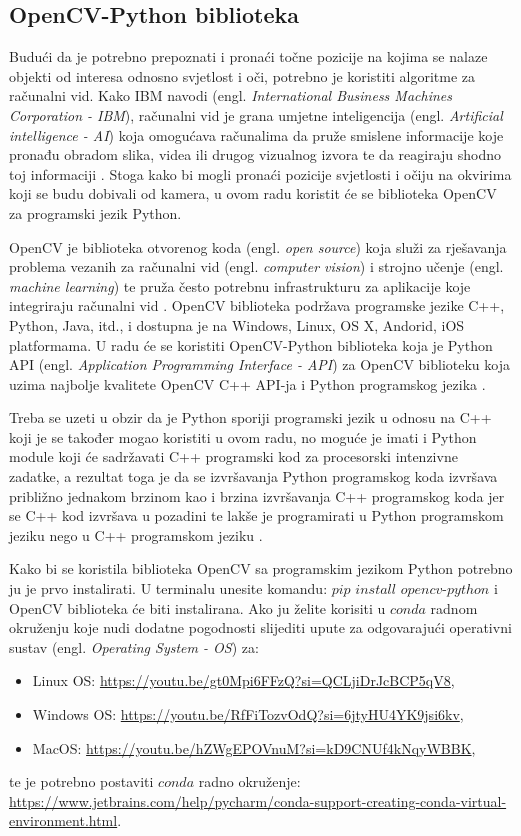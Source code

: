 \documentclass{foi}
\begin{document}
\subsection{OpenCV-Python biblioteka}

Budući da je potrebno prepoznati i pronaći točne pozicije na kojima se nalaze objekti od interesa odnosno svjetlost i oči, potrebno je koristiti algoritme za računalni vid. Kako IBM navodi (engl. \emph{International Business Machines Corporation - IBM}), računalni vid je grana umjetne inteligencija (engl. \emph{Artificial intelligence - AI}) koja omogućava računalima da pruže smislene informacije koje pronađu obradom slika, videa ili drugog vizualnog izvora te da reagiraju shodno toj informaciji \cite{cv-ibm}. Stoga kako bi mogli pronaći pozicije svjetlosti i očiju na okvirima koji se budu dobivali od kamera, u ovom radu koristit će se biblioteka OpenCV za programski jezik Python.

OpenCV je biblioteka otvorenog koda (engl. \emph{open source}) koja služi za rješavanja problema vezanih za računalni vid (engl. \emph{computer vision}) i strojno učenje (engl. \emph{machine learning}) te pruža često potrebnu infrastrukturu za aplikacije koje integriraju računalni vid \cite{opencv}. OpenCV biblioteka podržava programske jezike C++, Python, Java, itd., i dostupna je na Windows, Linux, OS X, Andorid, iOS platformama. U radu će se koristiti OpenCV-Python biblioteka koja je Python API (engl. \emph{Application Programming Interface - API}) za OpenCV biblioteku koja uzima najbolje kvalitete OpenCV C++ API-ja i Python programskog jezika \cite{opencv-python}.

Treba se uzeti u obzir da je Python sporiji programski jezik u odnosu na C++ koji je se također mogao koristiti u ovom radu, no moguće je imati i Python module koji će sadržavati C++ programski kod za procesorski intenzivne zadatke, a rezultat toga je da se izvršavanja Python programskog koda izvršava približno jednakom brzinom kao i brzina izvršavanja C++ programskog koda jer se C++ kod izvršava u pozadini te lakše je programirati u Python programskom jeziku nego u C++ programskom jeziku \cite{opencv-python}.

Kako bi se koristila biblioteka OpenCV sa programskim jezikom Python potrebno ju je prvo instalirati. U terminalu unesite komandu: $pip$ $install$ $opencv$-$python$ i OpenCV biblioteka će biti instalirana. Ako ju želite korisiti u $conda$ radnom okruženju koje nudi dodatne pogodnosti slijediti upute za odgovarajući operativni sustav (engl. \emph{Operating System - OS}) za:
\begin{itemize}[noitemsep]
    \item Linux OS: \url{https://youtu.be/gt0Mpi6FFzQ?si=QCLjiDrJcBCP5qV8},
    \item Windows OS: \url{https://youtu.be/RfFiTozvOdQ?si=6jtyHU4YK9jsi6kv},
    \item MacOS: \url{https://youtu.be/hZWgEPOVnuM?si=kD9CNUf4kNqyWBBK},
\end{itemize}
te je potrebno postaviti $conda$ radno okruženje: \url{https://www.jetbrains.com/help/pycharm/conda-support-creating-conda-virtual-environment.html}.
\end{document}

